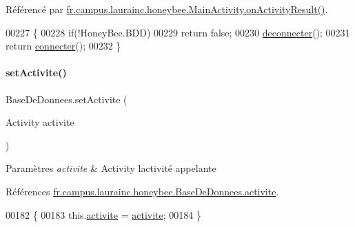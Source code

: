 Référencé par \hyperlink{classfr_1_1campus_1_1laurainc_1_1honeybee_1_1_main_activity_ae751b46f1881bda6b3b0e08025a9c044}{fr.\+campus.\+laurainc.\+honeybee.\+Main\+Activity.\+on\+Activity\+Result()}.


\begin{DoxyCode}
00227     \{
00228         \textcolor{keywordflow}{if}(!HoneyBee.BDD)
00229             \textcolor{keywordflow}{return} \textcolor{keyword}{false};
00230         \hyperlink{classfr_1_1campus_1_1laurainc_1_1honeybee_1_1_base_de_donnees_ae022ff0b4923d637f8d392cb908aa252}{deconnecter}();
00231         \textcolor{keywordflow}{return} \hyperlink{classfr_1_1campus_1_1laurainc_1_1honeybee_1_1_base_de_donnees_a08564ea7dccde161d6eac4b8879401bb}{connecter}();
00232     \}
\end{DoxyCode}
\mbox{\label{classfr_1_1campus_1_1laurainc_1_1honeybee_1_1_base_de_donnees_a4d5b875376c84e702c60bb54cee58c3f}} 
\paragraph{\texorpdfstring{set\+Activite()}{setActivite()}}
{\footnotesize\ttfamily Base\+De\+Donnees.\+set\+Activite (\begin{DoxyParamCaption}\item[{Activity}]{activite }\end{DoxyParamCaption})}


\begin{DoxyParams}{Paramètres}
{\em activite} & Activity l\textquotesingle{}activité appelante \\
\hline
\end{DoxyParams}


Références \hyperlink{classfr_1_1campus_1_1laurainc_1_1honeybee_1_1_base_de_donnees_aad4fd29f29916bc4277fa16262d19431}{fr.\+campus.\+laurainc.\+honeybee.\+Base\+De\+Donnees.\+activite}.


\begin{DoxyCode}
00182     \{
00183         this.\hyperlink{classfr_1_1campus_1_1laurainc_1_1honeybee_1_1_base_de_donnees_aad4fd29f29916bc4277fa16262d19431}{activite} = \hyperlink{classfr_1_1campus_1_1laurainc_1_1honeybee_1_1_base_de_donnees_aad4fd29f29916bc4277fa16262d19431}{activite};
00184     \}
\end{DoxyCode}
\mbox{\label{classfr_1_1campus_1_1laurainc_1_1honeybee_1_1_base_de_donnees_a0960cb9d71647e80e195a580f90cd0d6}} 
